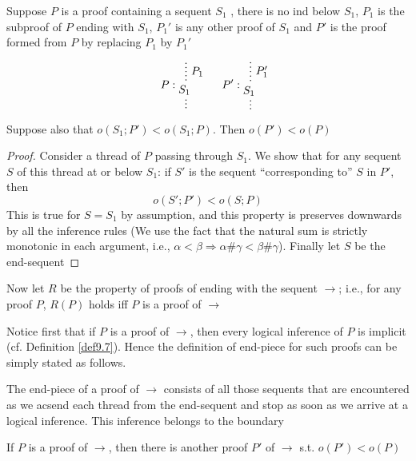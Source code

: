 \documentclass[11pt]{article}
\begin{document}
\begin{enumerate}
\begin{lemma}[]
\label{lemma12.7}
Suppose \(P\) is a proof containing a sequent \(S_1\) , there is no ind below \(S_1\), \(P_1\)
is the subproof of \(P\) ending with \(S_1\), \(P_1'\) is any other proof of \(S_1\)
and \(P'\) is the proof formed from \(P\) by replacing \(P_1\) by \(P_1'\)
  \begin{equation*}
P:
\begin{prooftree}%
\hypo{}
\ellipsis{\(P_1\)}{S_1}
\ellipsis{}{}
\end{prooftree}\hspace{1cm}
P':
\begin{prooftree}%
\hypo{}
\ellipsis{\(P_1'\)}{S_1}
\ellipsis{}{}
\end{prooftree}
  \end{equation*}
Suppose also that \(o(S_1;P')<o(S_1;P)\). Then \(o(P')<o(P)\)
\end{lemma}

\begin{proof}
Consider a thread of \(P\) passing through \(S_1\). We show that for any sequent \(S\) of this
thread at or below \(S_1\): if \(S'\) is the sequent ``corresponding to'' \(S\) in \(P'\), then
  \begin{equation*}
o(S';P')<o(S;P)
  \end{equation*}
This is true for \(S=S_1\) by assumption, and this property is preserves downwards by all the
inference rules (We use the fact that the natural sum is strictly monotonic in each argument,
i.e., \(\alpha<\beta\Rightarrow\alpha\#\gamma<\beta\#\gamma\)). Finally let \(S\) be the end-sequent
\end{proof}

Now let \(R\) be the property of proofs of ending with the sequent \(\to\); i.e., for any
proof \(P\), \(R(P)\) holds iff \(P\) is a proof of \(\to\)

Notice first that if \(P\) is a proof of \(\to\), then every logical inference of \(P\) is
implicit (cf. Definition \ref{def9.7}). Hence the definition of end-piece for such proofs can be
simply stated as follows.

The end-piece of a proof of \(\to\) consists of all those sequents that are encountered as we
acsend each thread from the end-sequent and stop as soon as we arrive at a logical inference.
This inference belongs to the boundary

\begin{lemma}[]
\label{lemma12.9}
If \(P\) is a proof of \(\to\), then there is another proof \(P'\) of \(\to\) s.t. \(o(P')<o(P)\)
\end{lemma}


\end{enumerate}
\end{document}
